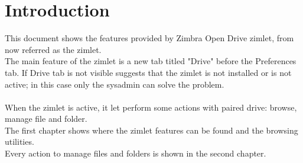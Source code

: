 \chapter{Introduction}
This document shows the features provided by Zimbra Open Drive zimlet, from now referred as the zimlet.\\
The main feature of the zimlet is a new tab titled "Drive" before the Preferences tab.
If Drive tab is not visible suggests that the zimlet is not installed or is not active;
in this case only the sysadmin can solve the problem.\\
\\
When the zimlet is active, it let perform some actions with paired drive: browse, manage file and folder.\\
The first chapter shows where the zimlet features can be found and the browsing utilities.\\
Every action to manage files and folders is shown in the second chapter.